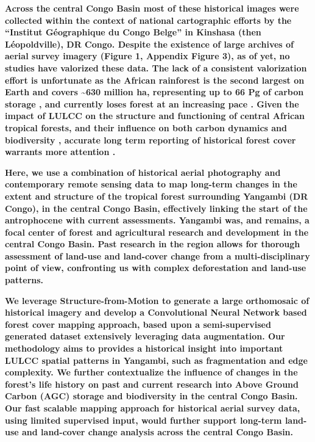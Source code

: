 \documentclass[remote sensing,article,submit,moreauthors,pdftex]{mdpi}
\begin{document}
\textbf{Across the central Congo Basin most of these historical images
were collected within the context of national cartographic efforts by
the ``Institut Géographique du Congo Belge'' in Kinshasa (then
Léopoldville), DR Congo. Despite the existence of large archives of
aerial survey imagery (Figure 1, Appendix Figure 3), as of yet, no
studies have valorized these data. The lack of a consistent valorization
effort is unfortunate as the African rainforest is the second largest on
Earth and covers \textasciitilde{}630 million ha, representing up to 66
Pg of carbon storage \citep{Lewis2009b}, and currently loses forest at
an increasing pace \citep{butsic2015}. Given the impact of LULCC on the
structure and functioning of central African tropical forests, and their
influence on both carbon dynamics \citep{Kearsley2013} and biodiversity
\citep{vandeperre2018}, accurate long term reporting of historical
forest cover warrants more attention \citep{willcock2016}.}

\textbf{Here, we use a combination of historical aerial photography and
contemporary remote sensing data to map long-term changes in the extent
and structure of the tropical forest surrounding Yangambi (DR Congo), in
the central Congo Basin, effectively linking the start of the
antrophocene \citep{lewis2015} with current assessments. Yangambi was,
and remains, a focal center of forest and agricultural research and
development in the central Congo Basin. Past research in the region
allows for thorough assessment of land-use and land-cover change from a
multi-disciplinary point of view, confronting us with complex
deforestation and land-use patterns.}

\textbf{We leverage Structure-from-Motion to generate a large
orthomosaic of historical imagery and develop a Convolutional Neural
Network based forest cover mapping approach, based upon a
semi-supervised generated dataset extensively leveraging data
augmentation. Our methodology aims to provides a historical insight into
important LULCC spatial patterns in Yangambi, such as fragmentation and
edge complexity. We further contextualize the influence of changes in
the forest's life history on past and current research into Above Ground
Carbon (AGC) storage \citep{Kearsley2013} and biodiversity
\citep{vandeperre2018} in the central Congo Basin. Our fast scalable
mapping approach for historical aerial survey data, using limited
supervised input, would further support long-term land-use and
land-cover change analysis across the central Congo Basin.}
\end{document}
